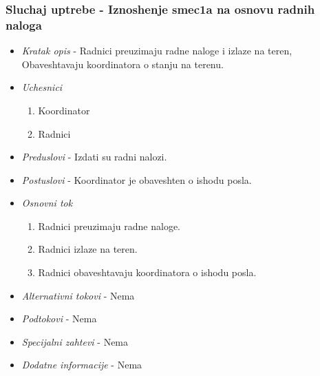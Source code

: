 \documentclass[10 pt]{article}
\begin{document}
	\subsubsection{Sluchaj uptrebe - Iznoshenje smec1a na osnovu radnih naloga}
	\begin{itemize}
		
		\item \textit{Kratak opis} - Radnici preuzimaju radne naloge i izlaze na teren, Obaveshtavaju koordinatora o stanju na terenu.
		
		\item \textit{Uchesnici}
		\begin{enumerate}
			\item Koordinator
			\item Radnici
		\end{enumerate}
		
		\item \textit{Preduslovi} - Izdati su radni nalozi.
		
		\item \textit{Postuslovi} - Koordinator je obaveshten o ishodu posla.
		
		\item \textit{Osnovni tok}
		\begin{enumerate}
			\item Radnici preuzimaju radne naloge.
			\item Radnici izlaze na teren.
			\item Radnici obaveshtavaju koordinatora o ishodu posla.
		\end{enumerate}
		
		\item \textit{Alternativni tokovi} - Nema
		
		\item \textit{Podtokovi} - Nema
		
		\item \textit{Specijalni zahtevi} - Nema
		
		\item \textit{Dodatne informacije} - Nema
		
	\end{itemize}
	
\end{document}
